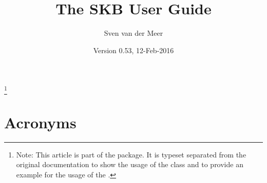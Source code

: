 \documentclass{skbarticle}
\begin{document}
  \title{The SKB User Guide}
  \author{Sven van der Meer}
  \date{Version 0.53, 12-Feb-2016}
  \maketitle

  \begin{abstract}
  \end{abstract}
  \footnote{
      Note: This article is part of the  package. It is typeset separated from 
      the original documentation to show the usage of the \cmd{\skbarticle} class
      and to provide an example for the usage of the .
  }

  \tableofcontents*



  \section*{Acronyms}
    \skbacronyms

  \printbibliography
\end{document}
